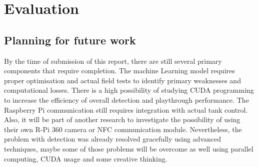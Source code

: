 \chapter{Evaluation}
\section{Planning for future work}
By the time of submission of this report, there are still several primary components that require completion. 
The machine Learning model requires proper optimisation and actual field tests to identify primary weaknesses and computational losses. 
There is a high possibility of studying CUDA programming to increase the efficiency of overall detection and playthrough performance.
The Raspberry Pi communication still requires integration with actual tank control. Also, it will be part of another research to investigate the possibility of using their own R-Pi 360 camera or NFC communication module.
Nevertheless, the problem with detection was already resolved gracefully using advanced techniques, maybe some of those problems will be overcome as well using parallel computing, CUDA usage and some creative thinking.
